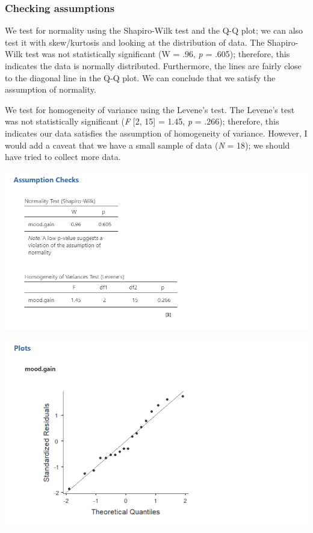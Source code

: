 \documentclass[
]{book}
\begin{document}
\hypertarget{checking-assumptions-4}{%
\subsubsection{Checking assumptions}\label{checking-assumptions-4}}

We test for normality using the Shapiro-Wilk test and the Q-Q plot; we can also test it with skew/kurtosis and looking at the distribution of data. The Shapiro-Wilk test was not statistically significant (W = .96, \emph{p} = .605); therefore, this indicates the data is normally distributed. Furthermore, the lines are fairly close to the diagonal line in the Q-Q plot. We can conclude that we satisfy the assumption of normality.

We test for homogeneity of variance using the Levene's test. The Levene's test was not statistically significant (\emph{F} {[}2, 15{]} = 1.45, \emph{p} = .266); therefore, this indicates our data satisfies the assumption of homogeneity of variance. However, I would add a caveat that we have a small sample of data (\emph{N} = 18); we should have tried to collect more data.

\includegraphics{images/04_one-way-anova/one-way_assumptions1.png}

\includegraphics{images/04_one-way-anova/one-way_assumptions2.png}
\end{document}

